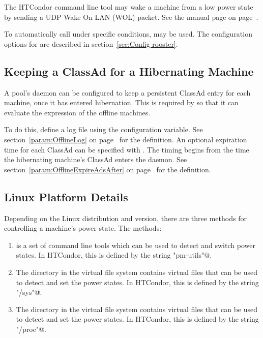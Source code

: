 The HTCondor command line tool  may wake a machine
from a low power state by 
sending a UDP Wake On LAN (WOL) packet.  See the  manual page on
page~\pageref{man-condor-power}.

To automatically call  under specific conditions,
 may be used.  The configuration options for
 are described in section~\ref{sec:Config-rooster}.

\subsection{Keeping a ClassAd for a Hibernating Machine}

A pool's  daemon can be configured to keep a 
persistent ClassAd entry for each machine, once it has entered hibernation.
This is required by  so that it can evaluate the
 expression of the offline machines.

To do this, define a log file using the 
configuration variable.
See section~\ref{param:OfflineLog} on
page~\pageref{param:OfflineLog} for the definition.
An optional expiration time for each ClassAd can
be specified with .
The timing begins from the time the hibernating machine's ClassAd enters
the  daemon.
See section~\ref{param:OfflineExpireAdsAfter} on
page~\pageref{param:OfflineExpireAdsAfter} for the definition.

\subsection{Linux Platform Details}

Depending on the Linux distribution and version,
there are three 
methods for controlling a machine's power state.
The methods:
\begin{enumerate}
\item {} is a set of command line tools which can be used to
  detect and switch power states.
  In HTCondor, this is defined by the string \verb@"pm-utils"@.
\item The directory in the virtual file system  
  contains virtual files that can be used to detect and set the power states.
  In HTCondor, this is defined by the string \verb@"/sys"@.
\item The directory in the virtual file system  
  contains virtual files that can be used to detect and set the power states.
  In HTCondor, this is defined by the string \verb@"/proc"@.
\end{enumerate}

